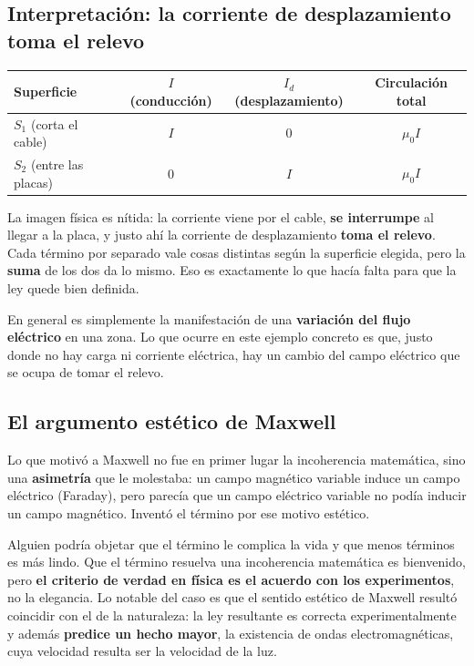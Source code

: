 \documentclass[12pt,a4paper]{article}
\begin{document}


\subsection{Interpretación: la corriente de desplazamiento toma el relevo}

\begin{table}[H]
\centering
\begin{tabular}{lccc}
\toprule
\textbf{Superficie} & $I$ (conducción) & $I_d$ (desplazamiento)
  & \textbf{Circulación total} \\
\midrule
$S_1$ (corta el cable)     & $I$ & $0$ & $\mu_0 I$ \\
$S_2$ (entre las placas)   & $0$ & $I$ & $\mu_0 I$ \\
\bottomrule
\end{tabular}
\end{table}

La imagen física es nítida: la corriente viene por el cable, \textbf{se
interrumpe} al llegar a la placa, y justo ahí la corriente de desplazamiento
\textbf{toma el relevo}. Cada término por separado vale cosas distintas
según la superficie elegida, pero la \textbf{suma} de los dos da lo mismo.
Eso es exactamente lo que hacía falta para que la ley quede bien definida.

\begin{notebox}
En general es simplemente la manifestación de una \textbf{variación del flujo
eléctrico} en una zona. Lo que ocurre en este ejemplo concreto es que, justo
donde no hay carga ni corriente eléctrica, hay un cambio del campo eléctrico
que se ocupa de tomar el relevo.
\end{notebox}

\subsection{El argumento estético de Maxwell}

Lo que motivó a Maxwell no fue en primer lugar la incoherencia matemática,
sino una \textbf{asimetría} que le molestaba: un campo magnético variable
induce un campo eléctrico (Faraday), pero parecía que un campo eléctrico
variable no podía inducir un campo magnético. Inventó el término por ese
motivo estético.

\begin{warnbox}
Alguien podría objetar que el término le complica la vida y que menos
términos es más lindo. Que el término resuelva una incoherencia matemática
es bienvenido, pero \textbf{el criterio de verdad en física es el acuerdo con
los experimentos}, no la elegancia. Lo notable del caso es que el sentido
estético de Maxwell resultó coincidir con el de la naturaleza: la ley
resultante es correcta experimentalmente y además \textbf{predice un hecho
mayor}, la existencia de ondas electromagnéticas, cuya velocidad resulta ser
la velocidad de la luz.
\end{warnbox}
\end{document}
